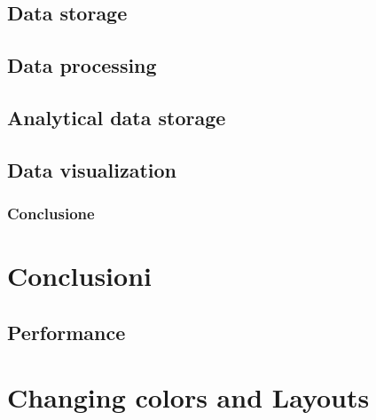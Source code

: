 \documentclass[13pt,aspectratio=169,t,xcolor=table]{beamer}
\begin{document}
\subsection{Data storage}
\subsection{Data processing}
\subsection{Analytical data storage}
\subsection{Data visualization}

\begin{frame}{}
    \frametitle{Conclusione}
\end{frame}
\section{Conclusioni}
\subsection{Performance}

\section{Changing colors and Layouts}

\end{document}
